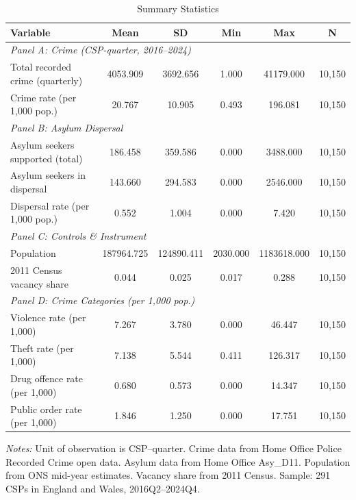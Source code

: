 \begin{table}[t]
\centering
\caption{Summary Statistics}
\label{tab:summary}
\small
\begin{tabular}{lccccc}
\hline\hline
Variable & Mean & SD & Min & Max & N \\
\hline
\multicolumn{6}{l}{\textit{Panel A: Crime (CSP-quarter, 2016--2024)}} \\
Total recorded crime (quarterly) & 4053.909 & 3692.656 & 1.000 & 41179.000 & 10,150 \\
Crime rate (per 1,000 pop.) & 20.767 & 10.905 & 0.493 & 196.081 & 10,150 \\
\hline
\multicolumn{6}{l}{\textit{Panel B: Asylum Dispersal}} \\
Asylum seekers supported (total) & 186.458 & 359.586 & 0.000 & 3488.000 & 10,150 \\
Asylum seekers in dispersal & 143.660 & 294.583 & 0.000 & 2546.000 & 10,150 \\
Dispersal rate (per 1,000 pop.) & 0.552 & 1.004 & 0.000 & 7.420 & 10,150 \\
\hline
\multicolumn{6}{l}{\textit{Panel C: Controls \& Instrument}} \\
Population & 187964.725 & 124890.411 & 2030.000 & 1183618.000 & 10,150 \\
2011 Census vacancy share & 0.044 & 0.025 & 0.017 & 0.288 & 10,150 \\
\hline
\multicolumn{6}{l}{\textit{Panel D: Crime Categories (per 1,000 pop.)}} \\
Violence rate (per 1,000) & 7.267 & 3.780 & 0.000 & 46.447 & 10,150 \\
Theft rate (per 1,000) & 7.138 & 5.544 & 0.411 & 126.317 & 10,150 \\
Drug offence rate (per 1,000) & 0.680 & 0.573 & 0.000 & 14.347 & 10,150 \\
Public order rate (per 1,000) & 1.846 & 1.250 & 0.000 & 17.751 & 10,150 \\
\hline\hline
\end{tabular}
\begin{tablenotes}\small
\item \textit{Notes:} Unit of observation is CSP--quarter. Crime data from Home Office Police Recorded Crime open data. Asylum data from Home Office Asy\_D11. Population from ONS mid-year estimates. Vacancy share from 2011 Census. Sample: 291 CSPs in England and Wales, 2016Q2--2024Q4.
\end{tablenotes}
\end{table}
